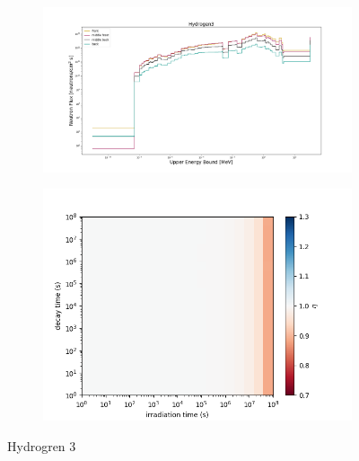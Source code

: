 \begin{figure}[!ht]
    \begin{subfigure}{0.5\textwidth}
        \includegraphics[scale=0.23, trim={4cm 1cm 4cm 2cm},clip]{figs/hydrogen3_flux.png}
    \end{subfigure}
    \begin{subfigure}{0.5\textwidth}
        \centering
        \includegraphics[scale=0.45, trim={0cm 0cm 2cm 0cm},clip]{figs/hydrogen3_front.png}
    \end{subfigure}
    \caption{Hydrogren 3 }
    \label{fig:1spec_8v}
\end{figure}
